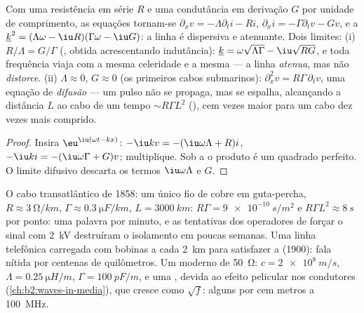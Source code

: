 \begin{proposition}\label{prop:b2:dispersion-wave-packets:lossy}
Com uma resistência em série $R$ e uma condutância em derivação $G$ por unidade de
comprimento, as equações tornam-se $\partial_xv = -\Lambda\partial_ti - Ri$, $\partial_xi =
-\Gamma\partial_tv - Gv$, e a  $\underline k^2 = (\Lambda\omega -
\iu R)(\Gamma\omega - \iu G)$: a linha é dispersiva e atenuante. Dois
limites: (i) $R/\Lambda = G/\Gamma$ (, obtida acrescentando
indutância): $\underline k = \omega\sqrt{\Lambda\Gamma} - \iu\sqrt{RG}$, e toda frequência
viaja com a mesma celeridade e a mesma  --- a linha
\emph{atenua}, mas não \emph{distorce}. (ii) $\Lambda \approx 0$, $G \approx 0$
(os primeiros cabos submarinos): $\partial_x^2v = R\Gamma\,\partial_tv$, uma
equação de \emph{difusão} --- um pulso não se propaga, mas se espalha,
alcançando a distância $L$ ao cabo de um tempo $\sim R\Gamma L^2$ (), cem vezes maior para um cabo dez vezes mais comprido.
\end{proposition}

\begin{proof}
Insira $\eu^{\iu(\omega t - kx)}$: $-\iu kv = -(\iu\omega\Lambda + R)i$, $-\iu ki = -(\iu
\omega\Gamma + G)v$; multiplique. Sob a  o produto é um
quadrado perfeito. O limite difusivo descarta os termos $\iu\omega\Lambda$ e $G$.
\end{proof}

\begin{example}\label{ex:b2:dispersion-wave-packets:cables}
O cabo transatlântico de 1858: um único fio de cobre em guta-percha,
$R \approx \qty{3}{\ohm/km}$, $\Gamma \approx \qty{0.3}{\micro F/km}$, $L = \qty{3000}{km}$:
$R\Gamma = \qty{9e-10}{s/m^2}$ e $R\Gamma L^2 \approx \qty{8}{s}$ por ponto: uma palavra por
minuto, e as tentativas dos operadores de forçar o sinal
com \qty{2}{kV} destruíram o isolamento em poucas semanas. Uma linha telefônica
carregada com bobinas a cada \qty{2}{km} para satisfazer a 
(1900): fala nítida por centenas de quilômetros. Um  moderno de \qty{50}{\ohm}:
$c = \qty{2e8}{m/s}$, $\Lambda = \qty{0.25}{\micro H/m}$, $\Gamma =
\qty{100}{pF/m}$, e uma , devida ao efeito pelicular nos
condutores (\cref{ch:b2:waves-in-media}), que cresce como $\sqrt f$: alguns
 por cem metros a \qty{100}{MHz}.
\end{example}

